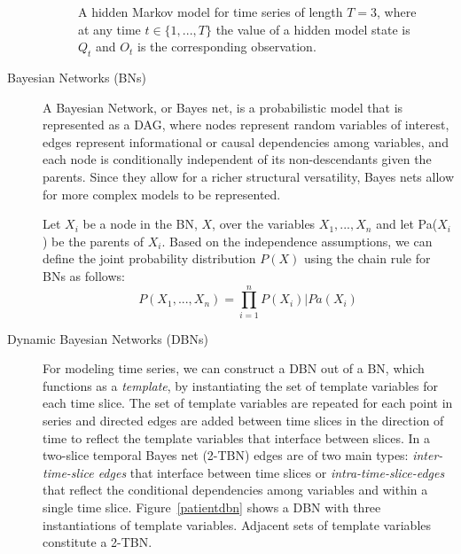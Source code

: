 \begin{description}
\begin{figure}
\begin{center}
\end{center}
\caption{A hidden Markov model for time series of length $T=3$, where at any time $t \in \{1,...,T\}$ the value of a hidden model state is $Q_{t}$ and $O_{t}$ is the corresponding observation.}
\label{hidden}
\end{figure}
  \item[Bayesian Networks (BNs)] A Bayesian Network, or Bayes net, is a probabilistic model that is represented as a DAG, where nodes represent random variables of interest, edges represent informational or causal dependencies among variables, and each node is conditionally independent of its non-descendants given the parents. Since they allow for a richer structural versatility, Bayes nets allow for more complex models to be represented.

      Let $X_i$ be a node in the BN, $X$, over the variables $X_{1},...,X_{n}$ and let Pa($X_i$) be the parents of $X_i$.  Based on the independence assumptions, we can define the joint probability distribution $P(X)$ using the chain rule for BNs as follows:
      $$P(X_{1},...,X_{n})= \prod_{i=1}^{n}P(X_i)|Pa(X_i)$$

    \item[Dynamic Bayesian Networks (DBNs)] For modeling time series, we can construct a DBN out of a BN, which functions as a \emph{template}, by instantiating the set of template variables for each time slice.  The set of template variables are repeated for each point in series and directed edges are added between time slices in the direction of time to reflect the template variables that interface between slices.  In a two-slice temporal Bayes net (2-TBN) edges are of two main types:  \emph{inter-time-slice edges} that interface between time slices or \emph{intra-time-slice-edges} that reflect the conditional dependencies among variables and within a single time slice.  Figure~\ref{patientdbn} shows a DBN with three instantiations of template variables.  Adjacent sets of template variables constitute a 2-TBN.
        \end{description}
        
